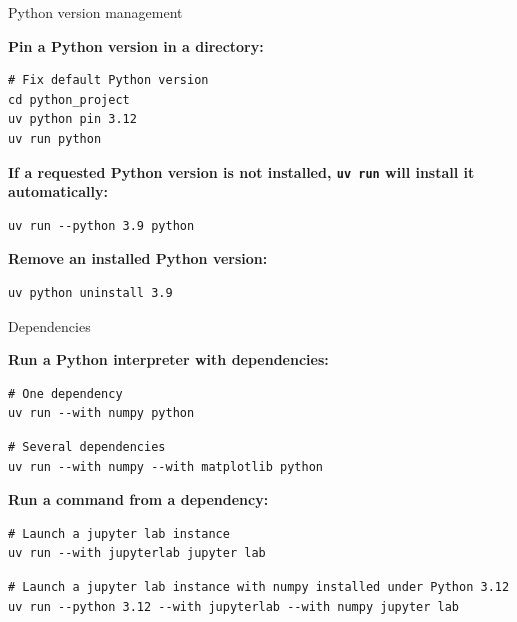 \documentclass[aspectratio=169,xcolor=dvipsnames,svgnames,x11names,fleqn]{beamer}
\begin{document}
\begin{frame}[containsverbatim]{Python version management}

    \textbf{Pin a Python version in a directory:}
    \begin{verbatim}
# Fix default Python version
cd python_project
uv python pin 3.12
uv run python
    \end{verbatim}

    \bigskip
    \textbf{If a requested Python version is not installed, \texttt{uv run} will install it automatically:}
    \begin{verbatim}
uv run --python 3.9 python
    \end{verbatim}

    \bigskip
    \textbf{Remove an installed Python version:}
    \begin{verbatim}
uv python uninstall 3.9
    \end{verbatim}

\end{frame}

\begin{frame}[containsverbatim]{Dependencies}

    \textbf{Run a Python interpreter with dependencies:}
    \begin{verbatim}
# One dependency
uv run --with numpy python
    \end{verbatim}
    \begin{verbatim}
# Several dependencies
uv run --with numpy --with matplotlib python
    \end{verbatim}

    \bigskip
    \textbf{Run a command from a dependency:}
    \begin{verbatim}
# Launch a jupyter lab instance
uv run --with jupyterlab jupyter lab
    \end{verbatim}
    \begin{verbatim}
# Launch a jupyter lab instance with numpy installed under Python 3.12
uv run --python 3.12 --with jupyterlab --with numpy jupyter lab
    \end{verbatim}

\end{frame}
\end{document}

